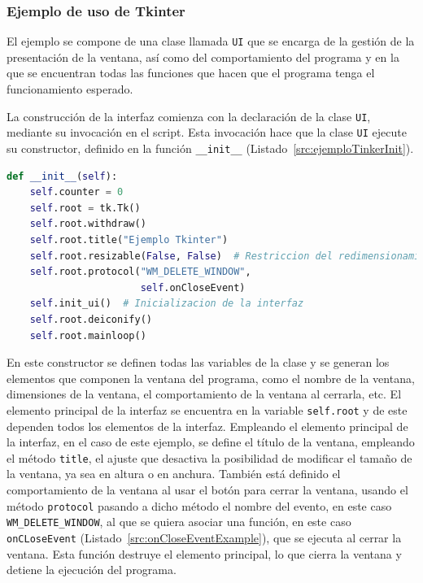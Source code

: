 \subsubsection{Ejemplo de uso de Tkinter}

El ejemplo se compone de una clase llamada \texttt{UI} que se encarga de la gestión de la presentación de la ventana, así como del comportamiento del programa y en la que se encuentran todas las funciones que hacen que el programa tenga el funcionamiento esperado.

La construcción de la interfaz comienza con la declaración de la clase \texttt{UI}, mediante su invocación en el script. Esta invocación hace que la clase \texttt{UI} ejecute su constructor, definido en la función \texttt{\_\_init\_\_} (Listado~\ref{src:ejemploTinkerInit}).

\begin{lstlisting}[language=Python,
                   style=python,
                   frame=none,
                   numbers=none,
                   basicstyle=\ttfamily\normalsize,
                   caption={Función \texttt{\_\_init\_\_} del ejemplo de Tkinter},
                   label=src:ejemploTinkerInit,
                   inputencoding=utf8]                   
def __init__(self):
    self.counter = 0
    self.root = tk.Tk()
    self.root.withdraw()
    self.root.title("Ejemplo Tkinter")
    self.root.resizable(False, False)  # Restriccion del redimensionamiento de la ventana principal
    self.root.protocol("WM_DELETE_WINDOW",
                       self.onCloseEvent)
    self.init_ui()  # Inicializacion de la interfaz
    self.root.deiconify()
    self.root.mainloop()
\end{lstlisting}

En este constructor se definen todas las variables de la clase y se generan los elementos que componen la ventana del programa, como el nombre de la ventana, dimensiones de la ventana, el comportamiento de la ventana al cerrarla, etc. El elemento principal de la interfaz se encuentra en la variable \texttt{self.root} y de este dependen todos los elementos de la interfaz. Empleando el elemento principal de la interfaz, en el caso de este ejemplo, se define el título de la ventana, empleando el método \texttt{title}, el ajuste que desactiva la posibilidad de modificar el tamaño de la ventana, ya sea en altura o en anchura. También está definido el comportamiento de la ventana al usar el botón para cerrar la ventana, usando el método \texttt{protocol} pasando a dicho método el nombre del evento, en este caso \texttt{WM\_DELETE\_WINDOW}, al que se quiera asociar una función, en este caso \texttt{onCLoseEvent} (Listado~\ref{src:onCloseEventExample}), que se ejecuta al cerrar la ventana. Esta función destruye el elemento principal, lo que cierra la ventana y detiene la ejecución  del programa.

